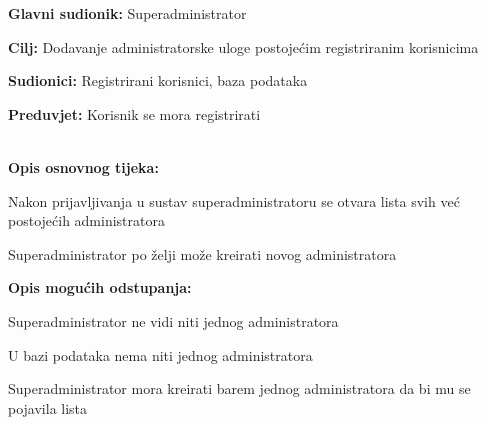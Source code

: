 				\noindent {}
				\begin{packed_item}

					\item \textbf{Glavni sudionik: } Superadministrator
					\item  \textbf{Cilj:} Dodavanje administratorske uloge postojećim registriranim korisnicima
					\item  \textbf{Sudionici:} Registrirani korisnici, baza podataka
					\item  \textbf{Preduvjet:} Korisnik se mora registrirati\\\\
					\item  \textbf{Opis osnovnog tijeka:}

					\item[] \begin{packed_enum}

						\item Nakon prijavljivanja u sustav superadministratoru se otvara lista svih već postojećih administratora
						\item Superadministrator po želji može kreirati novog administratora
					\end{packed_enum}

					\item  \textbf{Opis mogućih odstupanja:}

					\item[] \begin{packed_item}

						\item[1.a] Superadministrator ne vidi niti jednog administratora
						\item[] \begin{packed_enum}

							\item U bazi podataka nema niti jednog administratora
							\item Superadministrator mora kreirati barem jednog administratora da bi mu se pojavila lista\\

						\end{packed_enum}

					\end{packed_item}
				\end{packed_item}

